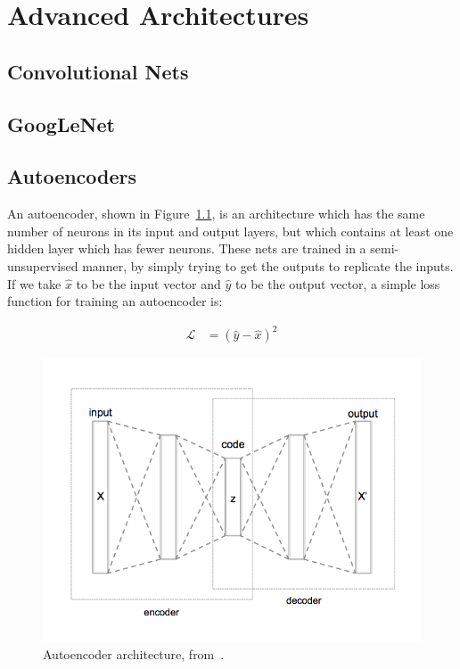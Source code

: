 \chapter{Advanced Architectures}\label{sec:advanced_architectures}

\section{Convolutional Nets}

\section{GoogLeNet}

\section{Autoencoders}

An autoencoder, shown in Figure~\ref{fig:autoencoder}, is an architecture which has the same number of neurons in its input and output layers, but which contains at least one hidden layer which has fewer neurons. These nets are trained in a semi-unsupervised manner, by simply trying to get the outputs to replicate the inputs. If we take $\hat{x}$ to be the input vector and $\hat{y}$ to be the output vector, a simple loss function for training an autoencoder is:

\begin{align}
    \mathcal{L} &= (\hat{y}-\hat{x})^2
\end{align}

\begin{figure}[htbp]
    \centering
    \includegraphics[width=\linewidth]{Images/ML/autoencoder.png}
    \caption{Autoencoder architecture, from~\cite{autoencoderDiagram}.}
    \label{fig:autoencoder}
\end{figure}

